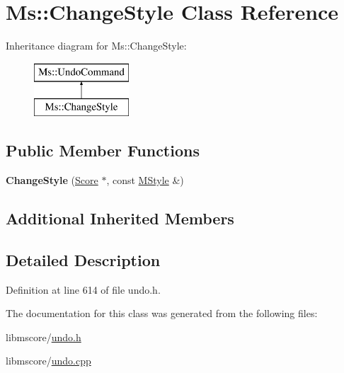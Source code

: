 \hypertarget{class_ms_1_1_change_style}{}\section{Ms\+:\+:Change\+Style Class Reference}
\label{class_ms_1_1_change_style}
Inheritance diagram for Ms\+:\+:Change\+Style\+:\begin{figure}[H]
\begin{center}
\leavevmode
\includegraphics[height=2.000000cm]{class_ms_1_1_change_style}
\end{center}
\end{figure}
\subsection*{Public Member Functions}
\begin{DoxyCompactItemize}
\item 
\mbox{\label{class_ms_1_1_change_style_ac98fc7c58f1d3a2cee60227dea558d07}} 
{\bfseries Change\+Style} (\hyperlink{class_ms_1_1_score}{Score} $\ast$, const \hyperlink{class_ms_1_1_m_style}{M\+Style} \&)
\end{DoxyCompactItemize}
\subsection*{Additional Inherited Members}


\subsection{Detailed Description}


Definition at line 614 of file undo.\+h.



The documentation for this class was generated from the following files\+:\begin{DoxyCompactItemize}
\item 
libmscore/\hyperlink{undo_8h}{undo.\+h}\item 
libmscore/\hyperlink{undo_8cpp}{undo.\+cpp}\end{DoxyCompactItemize}
